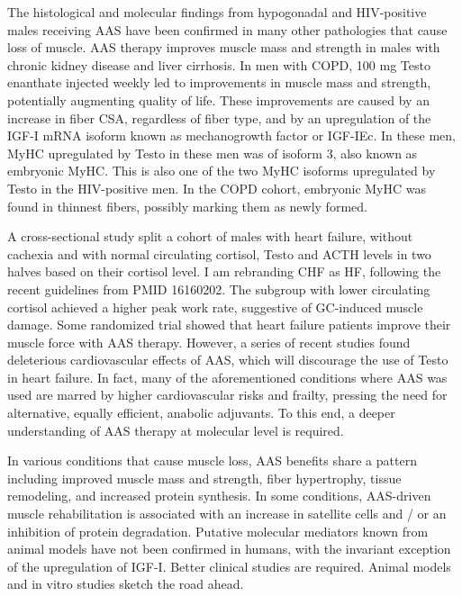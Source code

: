 \documentclass[12pt,english]{report}\usepackage[]{graphicx}\usepackage[]{color}
\newenvironment{lyxgreyedout}
  {\textcolor{note_fontcolor}\bgroup\ignorespaces}
  {\ignorespacesafterend\egroup}
\begin{document}
The histological and molecular findings from hypogonadal and HIV-positive
males receiving AAS have been confirmed in many other pathologies
that cause loss of muscle. AAS therapy improves muscle mass and strength
in males with chronic kidney disease and liver cirrhosis\citep{macdonald2007nandrolone,yurci2011effects}.
In men with COPD, 100 mg Testo enanthate injected weekly led to improvements
in muscle mass and strength, potentially augmenting quality of life\citep{casaburi2004effects}.
These improvements are caused by an increase in fiber CSA, regardless
of fiber type, and by an upregulation of the IGF-I mRNA isoform known
as mechanogrowth factor or IGF-IEc\citep{lewis2007skeletal}. In these
men, MyHC upregulated by Testo in these men was of isoform 3, also
known as embryonic MyHC. This is also one of the two MyHC isoforms
upregulated by Testo in the HIV-positive men. In the COPD cohort,
embryonic MyHC was found in thinnest fibers, possibly marking them
as newly formed.

A cross-sectional study split a cohort of males with heart failure,
without cachexia and with normal circulating cortisol, Testo and ACTH
levels in two halves based on their cortisol level. %
\begin{lyxgreyedout}
I am rebranding CHF as HF, following the recent guidelines from PMID
16160202.%
\end{lyxgreyedout}
{} The subgroup with lower circulating cortisol achieved a higher peak
work rate, suggestive of GC-induced muscle damage\citep{agapitou2013hormonal}.
Some randomized trial showed that heart failure patients improve their
muscle force with AAS therapy\citep{mirdamadi2014beneficial,stout2012testosterone}.
However, a series of recent studies found deleterious cardiovascular
effects of AAS\citep{xu2013testosterone,basaria2010adverse}, which
will discourage the use of Testo in heart failure. In fact, many of
the aforementioned conditions where AAS was used are marred by higher
cardiovascular risks and frailty, pressing the need for alternative,
equally efficient, anabolic adjuvants. To this end, a deeper understanding
of AAS therapy at molecular level is required.

In various conditions that cause muscle loss, AAS benefits share a
pattern including improved muscle mass and strength, fiber hypertrophy,
tissue remodeling, and increased protein synthesis. In some conditions,
AAS-driven muscle rehabilitation is associated with an increase in
satellite cells and / or an inhibition of protein degradation. Putative
molecular mediators known from animal models have not been confirmed
in humans, with the invariant exception of the upregulation of IGF-I.
Better clinical studies are required. Animal models and in vitro studies
sketch the road ahead.\pagebreak{}
\end{document}
